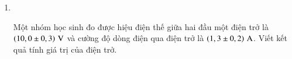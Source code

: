 \begin{enumerate}[label=\bfseries Bài \arabic*:,leftmargin=1.5cm]
{}

\item {}\\
{Một nhóm học sinh đo được hiệu điện thế giữa hai đầu một điện trở là $\xsi{\left(10,0\pm0,3\right)}{\volt}$ và cường độ dòng điện qua điện trở là $\xsi{\left(1,3\pm0,2\right)}{\ampere}$. Viết kết quả tính giá trị của điện trở.

}


\end{enumerate}

